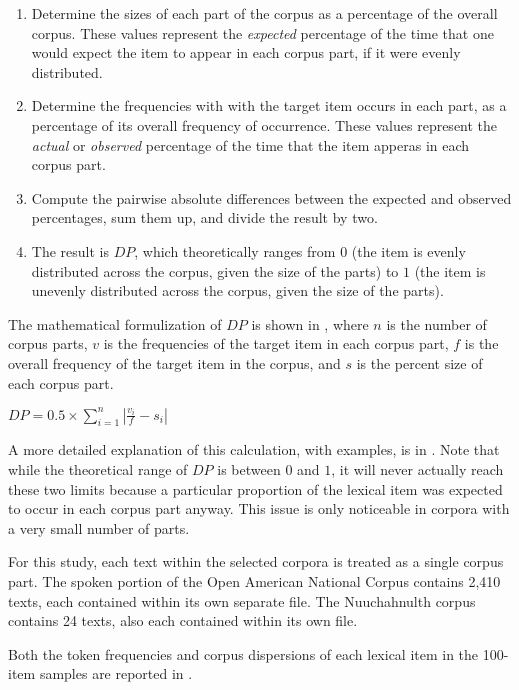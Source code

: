 \begin{enumerate}
  \item Determine the sizes of each part of the corpus as a percentage of the overall corpus. These values represent the \emph{expected} percentage of the time that one would expect the item to appear in each corpus part, if it were evenly distributed.
  \item Determine the frequencies with with the target item occurs in each part, as a percentage of its overall frequency of occurrence. These values represent the \emph{actual} or \emph{observed} percentage of the time that the item apperas in each corpus part.
  \item Compute the pairwise absolute differences between the expected and observed percentages, sum them up, and divide the result by two.
  \item The result is $DP$, which theoretically ranges from $0$ (the item is evenly distributed across the corpus, given the size of the parts) to $1$ (the item is unevenly distributed across the corpus, given the size of the parts).
\end{enumerate}

\noindent The mathematical formulization of $DP$ is shown in , where $n$ is the number of corpus parts, $v$ is the frequencies of the target item in each corpus part, $f$ is the overall frequency of the target item in the corpus, and $s$ is the percent size of each corpus part.

\begin{exe}
  \ex\label{ex:DP}
  $DP = 0.5 \times \displaystyle\sum_{i = 1}^{n}|\frac{v_i}{f} - s_i|$
\end{exe}

\noindent A more detailed explanation of this calculation, with examples, is in \textcite[§3]{Gries2008}. Note that while the theoretical range of $DP$ is between $0$ and $1$, it will never actually reach these two limits because a particular proportion of the lexical item was expected to occur in each corpus part anyway. This issue is only noticeable in corpora with a very small number of parts.

For this study, each text within the selected corpora is treated as a single corpus part. The spoken portion of the Open American National Corpus contains 2,410 texts, each contained within its own separate file. The Nuuchahnulth corpus contains 24 texts, also each contained within its own file.

Both the token frequencies and corpus dispersions of each lexical item in the 100-item samples are reported in .

